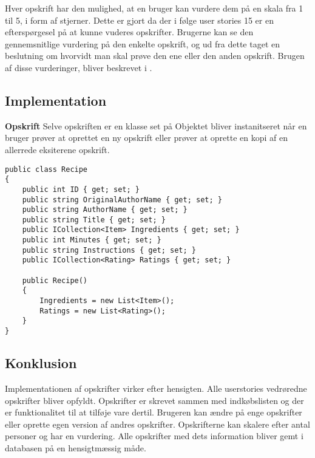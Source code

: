 Hver opskrift har den mulighed, at en bruger kan vurdere dem på en skala fra 1 til 5, i form af stjerner. Dette er gjort da der i følge user stories 15 er en efterspørgesel på at kunne vuderes opskrifter.
Brugerne kan se den gennemsnitlige vurdering på den enkelte opskrift, og ud fra dette taget en beslutning om hvorvidt man skal prøve den ene eller den anden opskrift.
Brugen af disse vurderinger, bliver beskrevet i .


\subsection{Implementation}
\textbf{Opskrift}
Selve opskriften er en klasse set på \myref{} Objektet bliver instanitseret når en bruger prøver at oprettet en ny opskrift eller prøver at oprette en kopi af en allerrede eksiterene opskrift.


\begin{lstlisting}[caption="Klassen Recipe som svarer til objektet\, opskrift"]
public class Recipe
{
    public int ID { get; set; }
    public string OriginalAuthorName { get; set; }
    public string AuthorName { get; set; }
    public string Title { get; set; }
    public ICollection<Item> Ingredients { get; set; }
    public int Minutes { get; set; }
    public string Instructions { get; set; }
    public ICollection<Rating> Ratings { get; set; }

    public Recipe()
    {
        Ingredients = new List<Item>();
        Ratings = new List<Rating>();
    }
}
\end{lstlisting}


\subsection{Konklusion}
Implementationen af opskrifter virker efter hensigten. Alle userstories vedrøredne opskrifter bliver opfyldt. Opskrifter er skrevet sammen med indkøbslisten og der er funktionalitet til at tilføje vare dertil. Brugeren kan ændre på enge opskrifter eller oprette egen version af andres opskrifter. Opskrifterne kan skalere efter antal personer og har en vurdering. Alle opskrifter med dets information bliver gemt i databasen på en hensigtmæssig måde.

